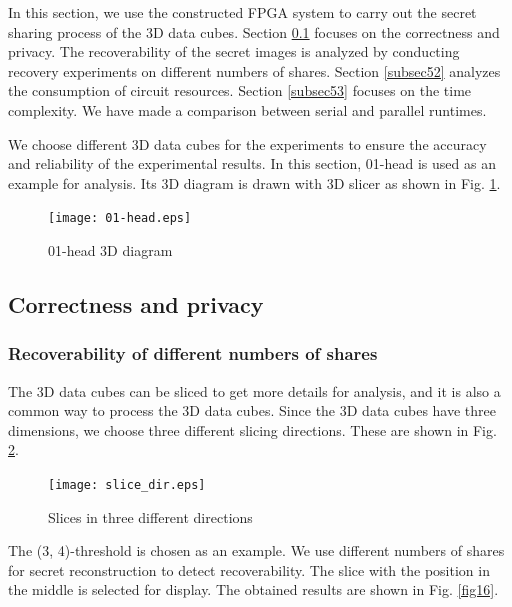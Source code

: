In this section, we use the constructed FPGA system to carry out the secret sharing process of the 3D data cubes. Section \ref{subsec51} focuses on the correctness and privacy. The recoverability of the secret images is analyzed by conducting recovery experiments on different numbers of shares. Section \ref{subsec52} analyzes the consumption of circuit resources. Section \ref{subsec53} focuses on the time complexity. We have made a comparison between serial and parallel runtimes.

We choose different 3D data cubes for the experiments to ensure the accuracy and reliability of the experimental results. In this section, 01-head is used as an example for analysis. Its 3D diagram is drawn with 3D slicer as shown in Fig. \ref{fig14}.

\begin{figure}[!htb]
	\begin{center}
		\texttt{[image: 01-head.eps]}\\
		\caption{01-head 3D diagram}
		\label{fig14}
		\vspace{-1.0em}
	\end{center}
\end{figure}

\subsection{Correctness and privacy}\label{subsec51}

\subsubsection{Recoverability of different numbers of shares}\label{subsec_Encoding}

The 3D data cubes can be sliced to get more details for analysis, and it is also a common way to process the 3D data cubes. Since the 3D data cubes have three dimensions, we choose three different slicing directions. These are shown in Fig. \ref{fig15}.

\begin{figure}[h]
	\begin{center}
		\texttt{[image: slice\_dir.eps]}\\
		\caption{Slices in three different directions}
		\label{fig15}
		\vspace{-2.0em}
	\end{center}
\end{figure}

The (3, 4)-threshold is chosen as an example. We use different numbers of shares for secret reconstruction to detect recoverability. The slice with the position in the middle is selected for display. The obtained results are shown in Fig. \ref{fig16}.

